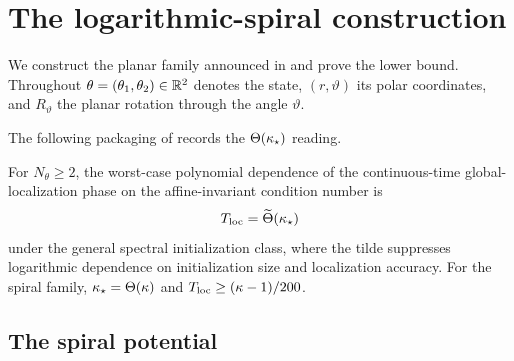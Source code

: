 \section{The logarithmic-spiral construction}
\label{app:spiral}

We construct the planar family announced in  and prove the lower bound.
Throughout $\theta=(\theta_1,\theta_2)\in\mathbb{R}^2$ denotes the state, $(r,\vartheta)$ its polar
coordinates, and $R_\vartheta$ the planar rotation through the angle $\vartheta$.

The following packaging of  records the $\Theta(\kappa_\star)$ reading.

\begin{corollary}\label{cor:sharp-cont}
    For $N_\theta\geq2$, the worst-case polynomial dependence of the continuous-time
    global-localization phase on the affine-invariant condition number is
    \begin{equation*}
        T_{\mathrm{loc}}=\widetilde\Theta(\kappa_\star)
    \end{equation*}
    under the general spectral initialization class, where the tilde suppresses logarithmic
    dependence on initialization size and localization accuracy. For the spiral family,
    $\kappa_\star=\Theta(\kappa)$ and $T_{\mathrm{loc}}\geq(\kappa-1)/200$.
\end{corollary}

\subsection{The spiral potential}

